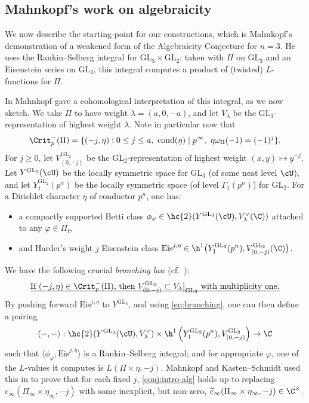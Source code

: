 \documentclass[10pt,reqno,a4paper]{amsart}
\newcommand{\subf}{_{\mathrm{f}}}
\newcommand{\GL}{\mathrm{GL}}
\begin{document}
\subsection{Mahnkopf's work on algebraicity}\label{sec:mahnkopf}

We now describe the starting-point for our constructions, which is Mahnkopf's demonstration of a weakened form of the Algebraicity Conjecture for $n = 3$. He uses the Rankin--Selberg integral for $\GL_3 \times \GL_2$: taken with $\Pi$ on $\GL_3$ and an Eisenstein series on $\GL_2$, this integral computes a product of (twisted) $L$-functions for $\Pi$.

In \cite{Mah98} Mahnkopf gave a cohomological interpretation of this integral, as we now sketch. We take $\Pi$ to have weight $\lambda = (a,0,-a)$, and let $V_\lambda$ be the $\GL_3$-representation of highest weight $\lambda$.  Note in particular now that
\begin{equation}\label{eq:crit pi intro}
	\Crit^-_p(\Pi) = \{(-j,\eta) : 0 \leq j \leq a, \ \mathrm{cond}(\eta) \mid p^\infty, \  \eta\omega_{\Pi}(-1) = (-1)^{j}\}.
\end{equation}
For $j \geq 0$, let $V_{(0,-j)}^{\GL_2}$ be the $\GL_2$-representation of highest weight $(x,y) \mapsto y^{-j}$. Let $Y^{\GL_3}(\cU)$ be the locally symmetric space for $\GL_3$ (of some neat level $\cU$), and let $Y^{\GL_2}_1(p^n)$ be the locally symmetric space (of level $\Gamma_1(p^n)$) for $\GL_2$.  For a Dirichlet character $\eta$ of conductor $p^n$, one has:
\begin{itemize}\setlength{\itemsep}{0pt}
	\item[--] a compactly supported Betti class $\phi_\varphi \in \hc{2}(Y^{\GL_3}(\cU), V_\lambda^\vee(\C))$ attached to any $\varphi\in\Pi\subf$,
	\item[--] and Harder's weight $j$ Eisenstein class $\mathrm{Eis}^{j,\eta} \in \h^1\big(Y^{\GL_2}_1(p^n),V_{(0,-j)}^{\GL_2}(\C)\big)$.
\end{itemize}
We have the following crucial \emph{branching law} (cf.\ \cite[Lem.\ 3.1]{Mah00}):
\begin{equation}\label{eq:branching}
	\text{\emph{If $(-j,\eta) \in \Crit_p^-(\Pi)$, then $V_{(0,-j)}^{\GL_2} \subset V_\lambda\big|_{\GL_2}$ with multiplicity one.}}
\end{equation}
By pushing forward $\mathrm{Eis}^{j,\eta}$ to $Y^{\GL_3}$, and using \eqref{eq:branching}, one can then define a pairing
\begin{equation}\label{eq:intro pairing}
	\langle-,-\rangle : \hc{2}(Y^{\GL_3}(\cU), V_\lambda^\vee) \times  \h^1\left(Y^{\GL_2}_1(p^n),V_{(0,-j)}^{\GL_2}\right) \to \C
\end{equation}
such that $\langle \phi_\varphi,\mathrm{Eis}^{j,\eta}\rangle$ is a Rankin--Selberg integral; and for appropriate $\varphi$, one of the $L$-values it computes is $L(\Pi\times\eta, -j)$. Mahnkopf and Kasten--Schmidt used this in \cite{Mah98,Mah00,KS13} to prove that for each fixed $j$, \cref{conj:intro-alg} holds up to replacing $e_\infty(\Pi_\infty \times \eta_\infty, -j)$ with some inexplicit, but non-zero, $\widetilde{e}_\infty(\Pi_\infty \times \eta_\infty, -j) \in \C^\times$.
\end{document}
